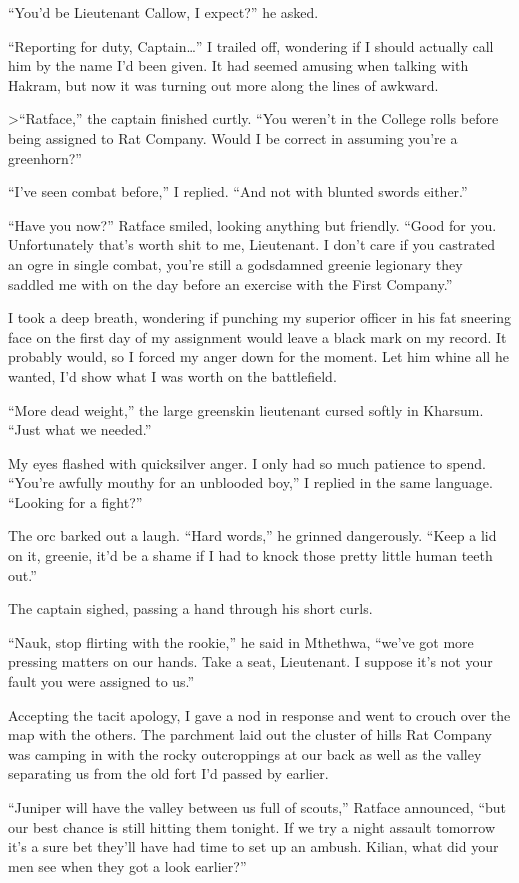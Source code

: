 \documentclass[12pt, openany]{book}
\begin{document}
“You’d be Lieutenant Callow, I expect?” he asked.

“Reporting for duty, Captain…” I trailed off, wondering if I should actually call him by the name I’d been given. It had seemed amusing when talking with Hakram, but now it was turning out more along the lines of awkward.

>“Ratface,” the captain finished curtly. “You weren’t in the College rolls before being assigned to Rat Company. Would I be correct in assuming you’re a greenhorn?”

“I’ve seen combat before,” I replied. “And not with blunted swords either.”

“Have you now?” Ratface smiled, looking anything but friendly. “Good for you. Unfortunately that’s worth shit to me, Lieutenant. I don’t care if you castrated an ogre in single combat, you’re still a godsdamned greenie legionary they saddled me with on the day before an exercise with the First Company.”

I took a deep breath, wondering if punching my superior officer in his fat sneering face on the first day of my assignment would leave a black mark on my record. It probably would, so I forced my anger down for the moment. Let him whine all he wanted, I’d show what I was worth on the battlefield.

“More dead weight,” the large greenskin lieutenant cursed softly in Kharsum. “Just what we needed.”

My eyes flashed with quicksilver anger. I only had so much patience to spend. “You’re awfully mouthy for an unblooded boy,” I replied in the same language. “Looking for a fight?” 

The orc barked out a laugh. “Hard words,” he grinned dangerously. “Keep a lid on it, greenie, it’d be a shame if I had to knock those pretty little human teeth out.”

The captain sighed, passing a hand through his short curls.

“Nauk, stop flirting with the rookie,” he said in Mthethwa, “we’ve got more pressing matters on our hands. Take a seat, Lieutenant. I suppose it’s not your fault you were assigned to us.”

Accepting the tacit apology, I gave a nod in response and went to crouch over the map with the others. The parchment laid out the cluster of hills Rat Company was camping in with the rocky outcroppings at our back as well as the valley separating us from the old fort I’d passed by earlier.

“Juniper will have the valley between us full of scouts,” Ratface announced, “but our best chance is still hitting them tonight. If we try a night assault tomorrow it’s a sure bet they’ll have had time to set up an ambush. Kilian, what did your men see when they got a look earlier?”
\end{document}
